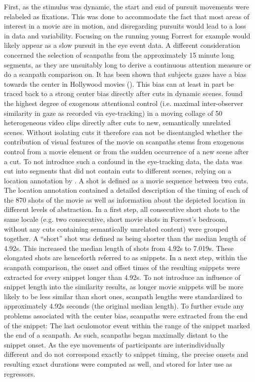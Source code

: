 \documentclass[a4paper, 12pt]{scrreprt}
\begin{document}
First, as the stimulus was dynamic, the start and end of pursuit movements were relabeled as fixations. This was done to accommodate the fact that most areas of interest in a movie are in motion, and disregarding pursuits would lead to a loss in data and variability. Focusing on the running young Forrest for example would likely appear as a slow pursuit in the eye event data. A different consideration concerned the selection of scanpaths from the approximately 15 minute long segments, as they are unsuitably long to derive a continuous attention measure or do a scanpath comparison on. It has been shown that subjects gazes have a bias towards the center in Hollywood movies (\cite{tseng2009quantifying}). This bias can at least in part be traced back to a strong center bias directly after cuts in dynamic scenes. \textcite{carmi2006visual} found the highest degree of exogenous attentional control (i.e. maximal inter-observer similarity in gaze as recorded via eye-tracking) in a moving collage of 50 heterogeneous video clips directly after cuts to new, semantically unrelated scenes. Without isolating cuts it therefore can not be disentangled whether the contribution of visual features of the movie on scanpaths stems from exogenous control from a movie element or from the sudden occurrence of a new scene after a cut. To not introduce such a confound in the eye-tracking data, the data was cut into segments that did not contain cuts to different scenes, relying on a location annotation by \textcite{hausler2016annotation}. A shot is defined as a movie sequence between two cuts. The location annotation contained a detailed description of the timing of each of the 870 shots of the movie as well as information about the depicted location in different levels of abstraction. In a first step, all consecutive short shots to the same locale (e.g. two consecutive, short movie shots in Forrest's bedroom, without any cuts containing semantically unrelated content) were grouped together. A “short” shot was defined as being shorter than the median length of 4.92s. This increased the median length of shots from 4.92s to 7.019s. These elongated shots are henceforth referred to as snippets. In a next step, within the scanpath comparison, the onset and offset times of the resulting snippets were extracted for every snippet longer than 4.92s. To not introduce an influence of snippet length into the similarity results, as longer movie snippets will be more likely to be less similar than short ones, scanpath lengths were standardized to approximately 4.92s seconds (the original median length). To further evade any problems associated with the center bias, scanpaths were extracted from the end of the snippet: The last oculomotor event within the range of the snippet marked the end of a scanpath. As such, scanpaths began maximally distant to the snippet onset.
As the eye movements of participants are interindividually different and do not correspond exactly to snippet timing, the precise onsets and resulting exact durations were computed as well, and stored for later use as regressors.
\end{document}
